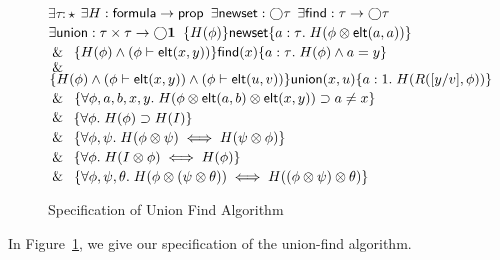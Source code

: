 \begin{figure}
  \begin{specification}
    \nextline
    $\exists \tau : \star$ 
    \nextline 
    $\exists H : \mathsf{formula} \to \mathsf{prop}$ 
    \nextline
    $\exists \mathsf{newset} : \bigcirc{\tau}$ 
    \nextline
    $\exists \mathsf{find} : \tau \to \bigcirc{\tau}$ 
    \nextline
    $\exists \mathsf{union} : \tau \times \tau \to \bigcirc{\mathbf{1}}$
    \nextline 
      $\{{H(\phi)}\}{\mathsf{newset}}\{{a:\tau}.\;{H(\phi \otimes \mathsf{elt}({a}, {a}))}\}$
    \\ \> $\;\&\;$
    \nextline 
      $\{{H(\phi) \land ({\phi} \vdash \mathsf{elt}({x}, {y}))}\}{\mathsf{find}(x)}\{{a:\tau}.\;{H(\phi) \land a = y}\}$
    \\ \> $\;\&\;$
    \nextline 
      $\{{H(\phi) \land ({\phi} \vdash \mathsf{elt}({x}, {y}))
                     \land ({\phi} \vdash \mathsf{elt}({u}, {v}))}\}{\mathsf{union}(x, u)}\{{a:1}.\;{H(R([y/v], \phi))}\}$ 
    \\ \> $\;\&\;$
    \nextline
      $\{{\forall \phi, a,b,x,y.\;H(\phi \otimes \mathsf{elt}({a}, {b}) \otimes \mathsf{elt}({x}, {y})) \supset a \not= x}\}$
    \\ \> $\;\&\;$
    \nextline
      $\{{\forall \phi.\;H(\phi) \supset H(I)}\}$
    \\ \> $\;\&\;$
    \nextline
      $\{{\forall \phi, \psi.\;H(\phi \otimes \psi) \iff H(\psi \otimes \phi)}\}$
    \\ \> $\;\&\;$
    \nextline
      $\{{\forall \phi.\;H(I \otimes \phi) \iff H(\phi)}\}$
    \\ \> $\;\&\;$
    \nextline
      $\{{\forall \phi, \psi, \theta.\;H(\phi \otimes (\psi \otimes \theta)) \iff H((\phi \otimes \psi) \otimes \theta)}\}$
  \end{specification}

\caption{Specification of Union Find Algorithm}
\label{union-find:spec}
\end{figure}

In Figure~\ref{union-find:spec}, we give our specification of the
union-find algorithm. 

